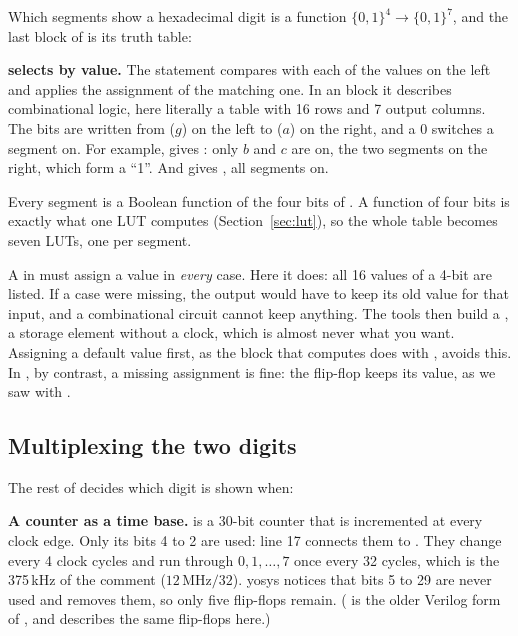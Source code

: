 Which segments show a hexadecimal digit is a function
$\{0,1\}^4 \to \{0,1\}^7$, and the last block of  is its truth
table:


\textbf{ selects by value.} The  statement compares
 with each of the values on the left and applies the assignment of
the matching one. In an  block it describes combinational
logic, here literally a table with 16 rows and 7 output columns. The bits are
written from  ($g$) on the left to  ($a$) on
the right, and a 0 switches a segment on. For example,  gives
: only $b$ and $c$ are on, the two segments on the right, which
form a ``1''. And  gives , all segments on.

Every segment is a Boolean function of the four bits of . A function
of four bits is exactly what one LUT computes (Section~\ref{sec:lut}), so the
whole table becomes seven LUTs, one per segment.

\begin{pitfall}
A  in  must assign a value in \emph{every} case.
Here it does: all 16 values of a 4-bit  are listed. If a case were
missing, the output would have to keep its old value for that input, and a
combinational circuit cannot keep anything. The tools then build a
, a storage element without a clock, which is almost never what
you want. Assigning a default value first, as the block that computes
 does with , avoids this. In , by contrast, a missing assignment is fine:
the flip-flop keeps its value, as we saw with .
\end{pitfall}

\subsection*{Multiplexing the two digits}

The rest of  decides which digit is shown when:


\textbf{A counter as a time base.}  is a 30-bit counter that is
incremented at every clock edge. Only its bits 4 to 2 are used: line 17
connects them to . They change every 4 clock cycles and run through
$0, 1, \dots, 7$ once every 32 cycles, which is the 375\,kHz of the comment
($12\,\text{MHz} / 32$). yosys notices that bits 5 to 29 are never used and
removes them, so only five flip-flops remain. ( is
the older Verilog form of , and describes the same
flip-flops here.)


